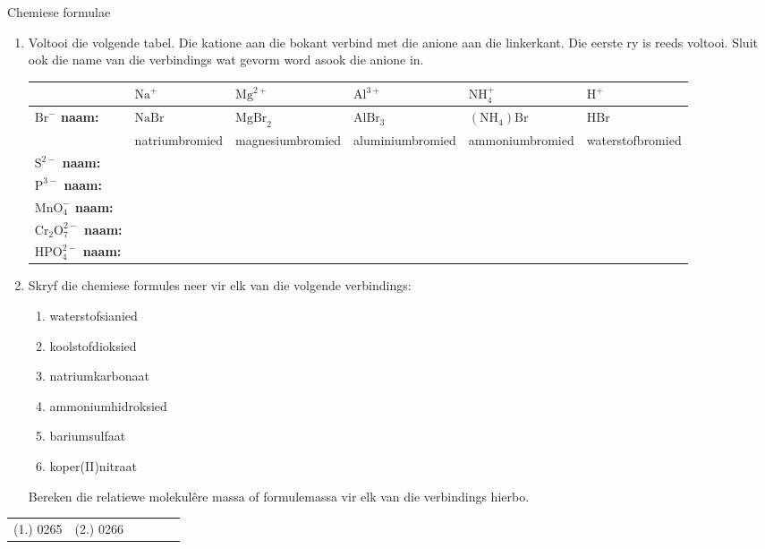 \begin{exercises}{Chemiese formulae }
{
            \nopagebreak
        \label{m38689*id145052}\begin{enumerate}[noitemsep, label=\textbf{\arabic*}. ] 
            \label{m38689*uid100}\item 
Voltooi die volgende tabel. Die katione aan die bokant verbind met die anione aan die linkerkant. Die eerste ry is reeds voltooi. Sluit ook die name van die verbindings wat gevorm word asook die anione in.
          \begin{table}[H]
        \begin{center}
      \label{m38689*id145067}
    \noindent
      \begin{tabular}{|p{1cm}|p{2.5cm}|p{2.5cm}|p{2.5cm}|p{2.5cm}|p{2.5cm}|}\hline
        &\textbf{ $\text{Na}^{+}$} & \textbf{$\text{Mg}^{2+}$} & \textbf{$\text{Al}^{3+}$} & \textbf{$\text{NH}_{4}^{+}$} & \textbf{$\text{H}^{+}$} \\ \hline
\multirow{2}{1cm}{\textbf{$\text{Br}^{-}$ naam:}} & $\text{NaBr}$  & $\text{MgBr}_2$  & $\text{AlBr}_3$  & $(\text{NH}_{4})\text{Br}$  & $\mathrm{HBr}$  \\ 
 & natriumbromied & magnesiumbromied & aluminiumbromied & ammoniumbromied & waterstofbromied \\ \hline
\textbf{$\text{S}^{2-}$ naam:} & & & & & \\ \hline
\textbf{$\text{P}^{3-}$ naam:} & & & & & \\ \hline
\textbf{$\text{MnO}_{4}^{-}$ naam:} & & & & & \\ \hline
\textbf{$\text{Cr}_{2}\text{O}_{7}^{2-}$ naam:} & & & & & \\ \hline
\textbf{$\text{HPO}_{4}^{2-}$ naam:} & & & & & \\ \hline
    \end{tabular}
      \end{center}
\end{table}
    \par
          \label{m38689*uid101}\item Skryf die chemiese formules neer vir elk van die volgende verbindings:
\label{m38689*id145444}\begin{enumerate}[noitemsep, label=\textbf{\alph*}. ] 
            \label{m38689*uid102}\item waterstofsianied
\label{m38689*uid103}\item koolstofdioksied
\label{m38689*uid104}\item natriumkarbonaat
\label{m38689*uid105}\item ammoniumhidroksied
\label{m38689*uid106}\item bariumsulfaat
\item koper(II)nitraat
\end{enumerate}
Bereken die relatiewe molekul\^{e}re massa of formulemassa vir elk van die verbindings hierbo.
                \end{enumerate}

\practiceinfo
\begin{tabular}[h]{cccccc}
 (1.) 0265  &  (2.) 0266  &
\end{tabular}
}
\end{exercises}
